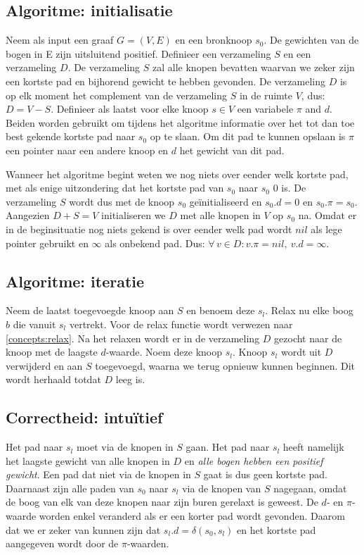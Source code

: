 \documentclass[conference]{IEEEtran}
\theoremstyle{definition}
\theoremstyle{remark}
\let \oldforall \forall
\renewcommand{\forall}{\oldforall\,}
\begin{document}
\subsection{Algoritme: initialisatie}
Neem als input een graaf $G = (V, E)$ en een bronknoop $s_0$. De gewichten van de bogen in E zijn uitsluitend positief. Definieer een verzameling $S$ en een verzameling $D$. De verzameling $S$ zal alle knopen bevatten waarvan we zeker zijn een kortste pad en bijhorend gewicht te hebben gevonden. De verzameling $D$ is op elk moment het complement van de verzameling $S$ in de ruimte $V$, dus: $D = V - S$. Definieer als laatst voor elke knoop $s \in V$ een variabele $\pi$ and $d$. Beiden worden gebruikt om tijdens het algoritme informatie over het tot dan toe best gekende kortste pad naar $s_0$ op te slaan. Om dit pad te kunnen opslaan is $\pi$ een pointer naar een andere knoop en $d$ het gewicht van dit pad.

Wanneer het algoritme begint weten we nog niets over eender welk kortste pad, met als enige uitzondering dat het kortste pad van $s_0$ naar $s_0$ $0$ is. De verzameling $S$ wordt dus met de knoop $s_0$ geïnitialiseerd en $s_{0}.d = 0$ en $s_{0}.\pi = s_0$. Aangezien $D + S = V$ initialiseren we $D$ met alle knopen in $V$ op $s_0$ na. Omdat er in de beginsituatie nog niets gekend is over eender welk pad wordt $nil$ als lege pointer gebruikt en $\infty$ als onbekend pad. Dus: $\forall v \in D: v.\pi = nil,\ v.d = \infty$.

\subsection{Algoritme: iteratie}
Neem de laatst toegevoegde knoop aan $S$ en benoem deze $s_l$. Relax nu elke boog $b$ die vanuit $s_l$ vertrekt. Voor de relax functie wordt verwezen naar \ref{concepts:relax}. Na het relaxen wordt er in de verzameling $D$ gezocht naar de knoop met de laagste $d$-waarde. Noem deze knoop $s_l$. Knoop $s_l$ wordt uit $D$ verwijderd en aan $S$ toegevoegd, waarna we terug opnieuw kunnen beginnen. Dit wordt herhaald totdat $D$ leeg is.

\subsection{Correctheid: intuïtief}
Het pad naar $s_l$ moet via de knopen in $S$ gaan. Het pad naar $s_l$ heeft namelijk het laagste gewicht van alle knopen in $D$ en \emph{alle bogen hebben een positief gewicht}. Een pad dat niet via de knopen in $S$ gaat is dus geen kortste pad. Daarnaast zijn alle paden van $s_0$ naar $s_l$ via de knopen van $S$ nagegaan, omdat de boog van elk van deze knopen naar zijn buren gerelaxt is geweest. De $d$- en $\pi$-waarde worden enkel veranderd als er een korter pad wordt gevonden. Daarom dat we er zeker van kunnen zijn dat $s_l.d = \delta(s_0, s_l)$ en het kortste pad aangegeven wordt door de $\pi$-waarden.
\end{document}
